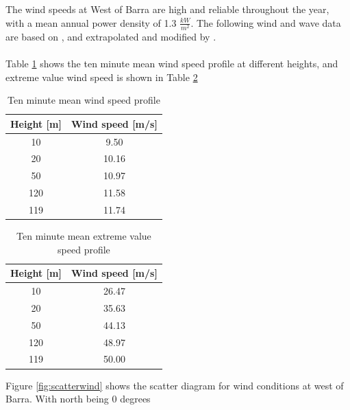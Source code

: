 The wind speeds at West of Barra are high and reliable throughout the year, with a mean annual power density of 1.3 $\frac{kW}{m^2}$. The following wind and wave data are based on \cite{geos2001}, and extrapolated and modified by \cite{Lifes50+D1.1}. 
\\\\
Table \ref{table:wind} shows the ten minute mean wind speed profile at different heights, and extreme value wind speed is shown in Table  \ref{table:windex}
\begin{table} [H]
\centering
\begin{tabular}{ |c|c|}
\hline
 Height [m]& Wind speed [m/s]\\
 \hline
 \hline
 10 & 9.50 \\

 20 & 10.16 \\
 
 50 & 10.97 \\
 
 120 & 11.58 \\

 119 & 11.74  \\
 \hline
\end{tabular}
\caption{Ten minute mean wind speed profile}
\label{table:wind}
\end{table}

\begin{table} [H]
\centering
\begin{tabular}{ |c|c|}
\hline
 Height [m]& Wind speed [m/s]\\
 \hline
 \hline
 10 & 26.47 \\

 20 & 35.63 \\
 
 50 & 44.13 \\
 
 120 & 48.97 \\

 119 & 50.00  \\
 \hline
\end{tabular}
\caption{Ten minute mean extreme value speed profile}
\label{table:windex}
\end{table}

\noindent Figure \ref{fig:scatterwind} shows the scatter diagram for wind conditions at west of Barra. With north being 0 degrees

